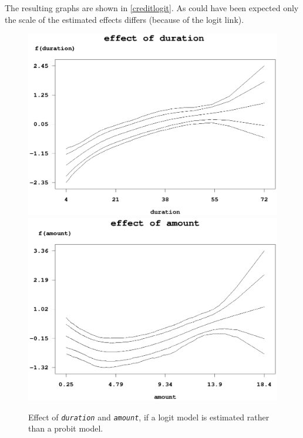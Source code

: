 The resulting graphs are shown in \autoref{creditlogit}. As could
have been expected only the scale of the estimated effects differs
(because of the logit link).

\begin{figure}[ht]
\vspace{0.5cm}
\begin{center}
\includegraphics[scale=0.65]{grafiken/credit_logit_duration.ps}

\vspace{0.5cm}
\includegraphics[scale=0.65]{grafiken/credit_logit_amount.ps}
\end{center}
{\em\caption{ \label{creditlogit} Effect of {\em\tt duration} and
{\em\tt amount}, if a logit model is estimated rather than a
probit model.}}
\end{figure}

